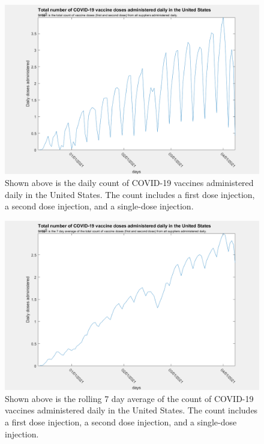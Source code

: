 \documentclass[twoside]{article}
\begin{document}
\begin{multicols}{2}
\begin{figure}[H]
	\includegraphics[width=\linewidth]{images/usa_daily_total_doses_unprocessed.png}
	\caption{Shown above is the daily count of COVID-19 vaccines administered daily in the United States. The count includes a first dose injection, a second dose injection, and a single-dose injection.}
	\label{fig:images/usa_daily_total_doses_unprocessedLabel}
\end{figure}

\begin{figure}[H]
	\includegraphics[width=\linewidth]{images/usa_daily_total_doses_processed.png}
	\caption{Shown above is the rolling 7 day average of the count of COVID-19 vaccines administered daily in the United States. The count includes a first dose injection, a second dose injection, and a single-dose injection.}
	\label{fig:images/usa_daily_total_doses_processedLabel}
\end{figure}


\end{multicols}
\end{document}
